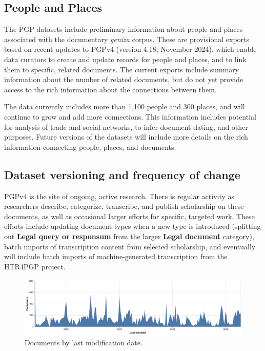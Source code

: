 \documentclass{article}
\begin{document}
\subsection{People and Places}

The PGP datasets include preliminary information about people and places associated with the documentary \textit{geniza }corpus. These are provisional exports based on recent updates to PGPv4 (version 4.18, November 2024), which enable data curators to create and update records for people and places, and to link them to specific, related documents. The current exports include summary information about the number of related documents, but do not yet provide access to the rich information about the connections between them.

The data currently includes more than 1,100 people and 300 places, and will continue to grow and add more connections. This information includes potential for analysis of trade and social networks, to infer document dating, and other purposes. Future versions of the datasets will include more details on the rich information connecting people, places, and documents.

\subsection{Dataset versioning and frequency of change}

PGPv4 is the site of ongoing, active research. There is regular activity as researchers describe, categorize, transcribe, and publish scholarship on these documents, as well as occasional larger efforts for specific, targeted work. These efforts include updating document types when a new type is introduced (splitting out \textbf{Legal query or responsum} from the larger \textbf{Legal document} category), batch imports of transcription content from selected scholarship, and eventually will include batch imports of machine-generated transcription from the HTR4PGP project.

\begin{figure}[!hbt]
  \includegraphics[width=\textwidth]{charts/docs_last_modified.pdf}
  \centering
  \caption{Documents by last modification date.}
  \label{fig:docs-last-modified}
\end{figure}
\end{document}
